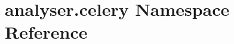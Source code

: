 \hypertarget{namespaceanalyser_1_1celery}{\section{analyser.\-celery Namespace Reference}
\label{namespaceanalyser_1_1celery}
}
